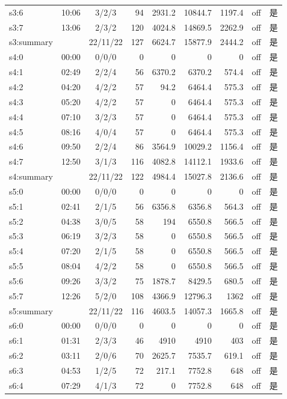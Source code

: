 \begin{tabular}{@{}llcrrrrrc@{}}
s3:6 & 10:06 & 3/2/3 & 94 & 2931.2 & 10844.7 & 1197.4 & off & 是\\
s3:7 & 13:06 & 2/3/2 & 120 & 4024.8 & 14869.5 & 2262.9 & off & 是\\
s3:summary &  & 22/11/22 & 127 & 6624.7 & 15877.9 & 2444.2 & off & 是\\
s4:0 & 00:00 & 0/0/0 & 0 & 0 & 0 & 0 & off & 是\\
s4:1 & 02:49 & 2/2/4 & 56 & 6370.2 & 6370.2 & 574.4 & off & 是\\
s4:2 & 04:20 & 4/2/2 & 57 & 94.2 & 6464.4 & 575.3 & off & 是\\
s4:3 & 05:20 & 4/2/2 & 57 & 0 & 6464.4 & 575.3 & off & 是\\
s4:4 & 07:10 & 3/2/3 & 57 & 0 & 6464.4 & 575.3 & off & 是\\
s4:5 & 08:16 & 4/0/4 & 57 & 0 & 6464.4 & 575.3 & off & 是\\
s4:6 & 09:50 & 2/2/4 & 86 & 3564.9 & 10029.2 & 1156.4 & off & 是\\
s4:7 & 12:50 & 3/1/3 & 116 & 4082.8 & 14112.1 & 1933.6 & off & 是\\
s4:summary &  & 22/11/22 & 122 & 4984.4 & 15027.8 & 2136.6 & off & 是\\
s5:0 & 00:00 & 0/0/0 & 0 & 0 & 0 & 0 & off & 是\\
s5:1 & 02:41 & 2/1/5 & 56 & 6356.8 & 6356.8 & 564.3 & off & 是\\
s5:2 & 04:38 & 3/0/5 & 58 & 194 & 6550.8 & 566.5 & off & 是\\
s5:3 & 06:19 & 3/2/3 & 58 & 0 & 6550.8 & 566.5 & off & 是\\
s5:4 & 07:20 & 2/1/5 & 58 & 0 & 6550.8 & 566.5 & off & 是\\
s5:5 & 08:04 & 4/2/2 & 58 & 0 & 6550.8 & 566.5 & off & 是\\
s5:6 & 09:26 & 3/3/2 & 75 & 1878.7 & 8429.5 & 680.5 & off & 是\\
s5:7 & 12:26 & 5/2/0 & 108 & 4366.9 & 12796.3 & 1362 & off & 是\\
s5:summary &  & 22/11/22 & 116 & 4603.5 & 14057.3 & 1665.8 & off & 是\\
s6:0 & 00:00 & 0/0/0 & 0 & 0 & 0 & 0 & off & 是\\
s6:1 & 01:31 & 2/3/3 & 46 & 4910 & 4910 & 403 & off & 是\\
s6:2 & 03:11 & 2/0/6 & 70 & 2625.7 & 7535.7 & 619.1 & off & 是\\
s6:3 & 04:53 & 1/2/5 & 72 & 217.1 & 7752.8 & 648 & off & 是\\
s6:4 & 07:29 & 4/1/3 & 72 & 0 & 7752.8 & 648 & off & 是\\

\end{tabular}
